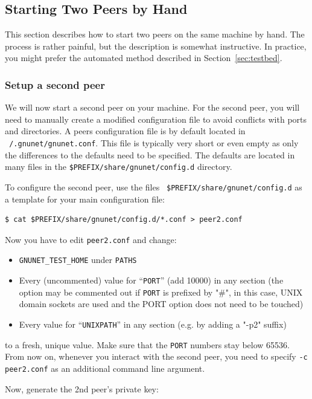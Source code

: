 \documentclass[10pt]{article}
\begin{document}
\subsection{Starting Two Peers by Hand}

This section describes how to start two peers on the same machine by hand.
The process is rather painful, but the description is somewhat instructive.
In practice, you might prefer the automated method described in
Section~\ref{sec:testbed}.

\subsubsection{Setup a second peer}
We will now start a second peer on your machine.
For the second peer, you will need to manually create a modified
configuration file to avoid conflicts with ports and directories.
A peers configuration file is by default located in {\tt ~/.gnunet/gnunet.conf}.
This file is typically very short or even empty as only the differences to the
defaults need to be specified.  The defaults are located in
many files in the {\tt \$PREFIX/share/gnunet/config.d} directory.

To configure the second peer, use the files {\tt
  \$PREFIX/share/gnunet/config.d} as a template for your main
configuration file:
%
\lstset{language=bash}
\lstset{language=bash}
\begin{lstlisting}
$ cat $PREFIX/share/gnunet/config.d/*.conf > peer2.conf
\end{lstlisting}
Now you have to edit {\tt peer2.conf} and change:
\begin{itemize}
  \itemsep0em
  \item{\texttt{GNUNET\_TEST\_HOME} under \texttt{PATHS}}
  \item{Every (uncommented) value for ``\texttt{PORT}'' (add 10000) in any
        section (the option may be commented out if \texttt{PORT} is
        prefixed by "\#", in this case, UNIX domain sockets are used
        and the PORT option does not need to be touched) }
  \item{Every value for ``\texttt{UNIXPATH}'' in any section (e.g. by adding a "-p2" suffix)}
\end{itemize}
to a fresh, unique value.  Make sure that the \texttt{PORT} numbers stay
below 65536.  From now on, whenever you interact with the second
peer, you need to specify {\tt -c peer2.conf} as an additional
command line argument.

Now, generate the 2nd peer's private key:
\end{document}
